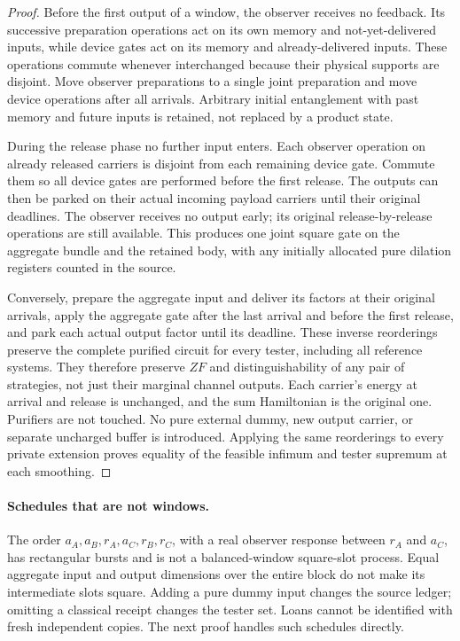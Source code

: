\begin{proof}
Before the first output of a window, the observer receives no feedback. Its successive preparation operations act on its own memory and not-yet-delivered inputs, while device gates act on its memory and already-delivered inputs. These operations commute whenever interchanged because their physical supports are disjoint. Move observer preparations to a single joint preparation and move device operations after all arrivals. Arbitrary initial entanglement with past memory and future inputs is retained, not replaced by a product state.

During the release phase no further input enters. Each observer operation on already released carriers is disjoint from each remaining device gate. Commute them so all device gates are performed before the first release. The outputs can then be parked on their actual incoming payload carriers until their original deadlines. The observer receives no output early; its original release-by-release operations are still available. This produces one joint square gate on the aggregate bundle and the retained body, with any initially allocated pure dilation registers counted in the source.

Conversely, prepare the aggregate input and deliver its factors at their original arrivals, apply the aggregate gate after the last arrival and before the first release, and park each actual output factor until its deadline. These inverse reorderings preserve the complete purified circuit for every tester, including all reference systems. They therefore preserve $ZF$ and distinguishability of any pair of strategies, not just their marginal channel outputs. Each carrier's energy at arrival and release is unchanged, and the sum Hamiltonian is the original one. Purifiers are not touched. No pure external dummy, new output carrier, or separate uncharged buffer is introduced. Applying the same reorderings to every private extension proves equality of the feasible infimum and tester supremum at each smoothing.
\end{proof}

\paragraph{Schedules that are not windows.}
The order $a_A,a_B,r_A,a_C,r_B,r_C$, with a real observer response between $r_A$ and $a_C$, has rectangular bursts and is not a balanced-window square-slot process. Equal aggregate input and output dimensions over the entire block do not make its intermediate slots square. Adding a pure dummy input changes the source ledger; omitting a classical receipt changes the tester set. Loans cannot be identified with fresh independent copies. The next proof handles such schedules directly.

